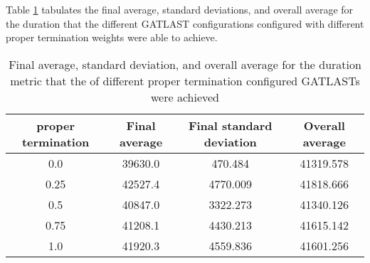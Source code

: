 Table \ref{tab:HP:GA:Livelyness:duration} tabulates the final average, standard deviations, and overall average for the duration that the different GATLAST configurations configured with different proper termination weights were able to achieve.
\begin{table}[tbh!]
\centering
\begin{adjustbox}{trim=0cm 0cm 0cm 0cm, clip=true}
\begin{tabular}{|c|c|c|c|}
\hline
proper termination & Final average & Final standard deviation & Overall average\\
\hline
0.0 & 39630.0 & 470.484 & 41319.578\\\hline
0.25 & 42527.4 & 4770.009 & 41818.666\\\hline
0.5 & 40847.0 & 3322.273 & 41340.126\\\hline
0.75 & 41208.1 & 4430.213 & 41615.142\\\hline
1.0 & 41920.3 & 4559.836 & 41601.256\\\hline
\end{tabular}
\end{adjustbox}
\caption{Final average, standard deviation, and overall average for the duration metric that the of different proper termination configured GATLASTs were achieved}
\label{tab:HP:GA:Livelyness:duration}
\end{table}